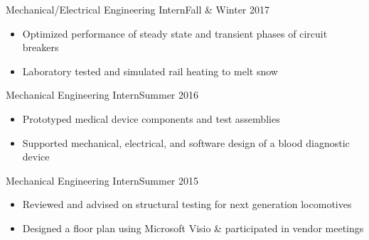 
\subtitle{Pentair}{Mechanical/Electrical Engineering Intern}{Fall \& Winter 2017}

\begin{itemize}
    \item Optimized performance of steady state and transient phases of circuit breakers
    \item Laboratory tested and simulated rail heating to melt snow

\end{itemize}



\subtitle{Accel Biotech}{Mechanical Engineering Intern}{Summer 2016}

\begin{itemize}
    \item Prototyped medical device components and test assemblies
    \item Supported mechanical, electrical, and software design of a blood diagnostic device

\end{itemize}


\subtitle{Caltrans}{Mechanical Engineering Intern}{Summer 2015}
\begin{itemize}
    \item Reviewed and advised on structural testing for next generation locomotives
    \item Designed a floor plan using Microsoft Visio \& participated in vendor meetings
    
\end{itemize}